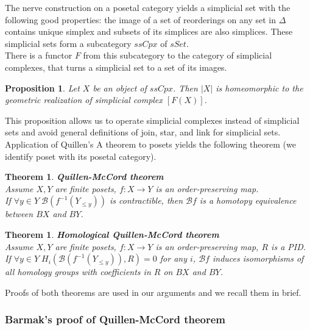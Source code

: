 \documentclass[english,12pt]{article}
\newcounter{stmcounter}[section]
\newcounter{thcounter}
\numberwithin{equation}{section}
\newtheorem{proposition}[stmcounter]{Proposition}
\newtheorem{theorem}[thcounter]{Theorem}
\theoremstyle{definition}
\theoremstyle{remark}
\begin{document}
The nerve construction on a posetal category yields a simplicial set with the following good properties: the image of a set of reorderings on any set in $\Delta$ contains unique simplex and subsets of its simplices are also simplices. These simplicial sets form a subcategory $ssCpx$ of $sSet$.\\

There is a functor $F$ from this subcategory to the category of simplicial complexes, that turns a simplicial set to a set of its images.\\

\begin{proposition}
  Let $X$ be an object of $ssCpx$. Then $|X|$ is homeomorphic to the geometric realization of simplicial complex $[F(X)]$.
\end{proposition}

This proposition allows us to operate simplicial complexes instead of simplicial sets and avoid general definitions of join, star, and link for simplicial sets.\\

Application of Quillen's A theorem to posets yields the following theorem (we identify poset with its posetal category).

\begin{theorem} \textbf{Quillen-McCord theorem}\\
  Assume $X, Y$ are finite posets, $f : X \to Y$ is an order-preserving map.\\
  If $\forall y \in Y\;\mathcal{B}(f^{-1}(Y_{\leqslant y}))$ is contractible, then $\mathcal{B}f$ is a homotopy equivalence between $BX$ and $BY$.\\
\end{theorem}

\begin{theorem} \textbf{Homological Quillen-McCord theorem} {\cite[Corollary 5.5]{Bar11}}\\
  Assume $X, Y$ are finite posets, $f : X \to Y$ is an order-preserving map, $R$ is a PID.\\
  If $\forall y \in Y\;H_i(\mathcal{B}(f^{-1}(Y_{\leqslant y})),R) = 0$ for any $i$, $\mathcal{B}f$ induces isomorphisms of all homology groups with coefficients in $R$ on $BX$ and $BY$.\\
\end{theorem}

Proofs of both theorems are used in our arguments and we recall them in brief.

\subsubsection{Barmak's proof of Quillen-McCord theorem}
\end{document}
